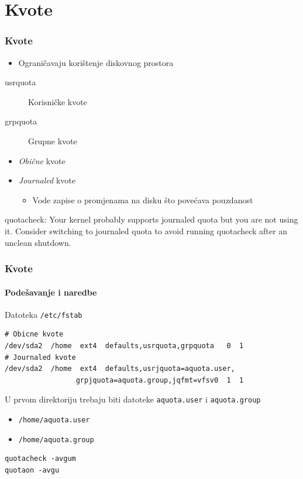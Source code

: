 \documentclass[t]{beamer}
\begin{document}
\section{Kvote}
\begin{frame}
	\frametitle{Kvote}
	\begin{itemize}
		\item Ograničavaju korištenje diskovnog prostora
	\end{itemize}
	\begin{description}
		\item[usrquota] Korisničke kvote
		\item[grpquota] Grupne kvote
	\end{description}
	\begin{itemize}
		\item \emph{Obične} kvote
		\item \emph{Journaled} kvote
		\begin{itemize}
			\item Vode zapise o promjenama na disku što povećava pouzdanost
		\end{itemize}
	\end{itemize}
	\vspace{1em}
	{\ttfamily \small
		quotacheck: Your kernel probably supports journaled quota but you are not using it.
		Consider switching to journaled quota to avoid running quotacheck after an unclean
		shutdown.
	}
\end{frame}

\begin{frame}[fragile]
	\frametitle{Kvote}
	\framesubtitle{Podešavanje i naredbe}
	Datoteka \texttt{/etc/fstab}
	{\small \begin{verbatim}
# Obicne kvote
/dev/sda2  /home  ext4  defaults,usrquota,grpquota   0  1
# Journaled kvote
/dev/sda2  /home  ext4  defaults,usrjquota=aquota.user,
                 grpjquota=aquota.group,jqfmt=vfsv0  1  1
	\end{verbatim} }
	U prvom direktoriju trebaju biti datoteke \texttt{aquota.user} i \texttt{aquota.group}
	\begin{itemize}
		\item[] \texttt{/home/aquota.user}
		\item[] \texttt{/home/aquota.group}
	\end{itemize}
	\begin{verbatim}
quotacheck -avgum
quotaon -avgu
	\end{verbatim}
\end{frame}
\end{document}
